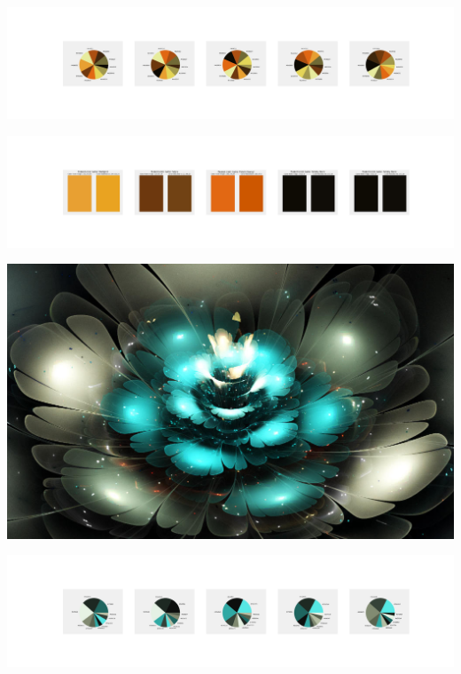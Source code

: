 \documentclass[11pt]{article}
\begin{document}
\begin{landscape}
    \begin{center}
    \includegraphics[width=250mm]{./nbimg/pie-394.jpg}
    \end{center}

    \begin{center}
    \includegraphics[width=250mm]{./nbimg/peak-394.jpg}
    \end{center}
    

    \begin{center}
    \includegraphics[width=\textwidth]{./nbimg/file (49).jpg}
    \end{center}

    \begin{center}
    \includegraphics[width=250mm]{./nbimg/pie-395.jpg}
    \end{center}


\end{landscape}
\end{document}
